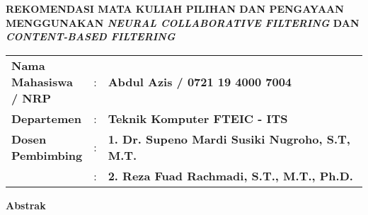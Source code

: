 {
\begin{center}
    \uppercase{\textbf{\large Rekomendasi mata kuliah pilihan dan pengayaan menggunakan \emph{Neural Collaborative Filtering} dan \emph{Content-Based Filtering}}}
\end{center}

\vspace*{6 mm}
\begin{adjustwidth}{}{}
    \begin{tabular}{lcp{1\linewidth}}
        \noindent\textbf{Nama Mahasiswa / NRP} & : & \textbf{Abdul Azis / 0721 19 4000 7004}                \\
        \noindent\textbf{Departemen}           & : & \textbf{Teknik Komputer FTEIC - ITS}                   \\
        \noindent\textbf{Dosen Pembimbing}     & : & \textbf{1. Dr. Supeno Mardi Susiki Nugroho, S.T, M.T.} \\
                                               & : & \textbf{2. Reza Fuad Rachmadi, S.T., M.T., Ph.D.}      \\
    \end{tabular}
\end{adjustwidth}

\vspace{6 mm}
\noindent
\textbf{Abstrak}
\vspace{3 mm}

}
